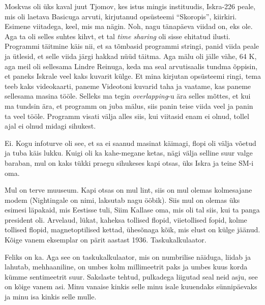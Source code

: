 Moskvas oli üks kaval juut Tjomov, kes istus mingis instituudis, Iskra-226 peale, mis oli laetava Basicuga arvuti, kirjutanud opsüsteemi \enquote{Skoropis}, kiirkiri. Esimene viitadega, keel, mis ma nägin. Noh, nagu tänapäeva viidad on, eks ole. Aga ta oli selles suhtes kihvt, et tal \emph{time sharing} oli sisse ehitatud ilusti. Programmi täitmine käis nii, et sa tõmbasid programmi stringi, panid viida peale ja ütlesid, et selle viida järgi hakkad nüüd täitma. Aga mälu oli jälle vähe, 64 K, aga meil oli sellesama Lindre Reinuga, keda ma seal arvutisaalis tundma õppisin, et paneks Iskrale veel kaks kuvarit külge. Et mina kirjutan opsüsteemi ringi, tema teeb kaks videokaarti, paneme Videotoni kuvarid taha ja vaatame, kas paneme sellesama masina tööle.  Selleks ma tegin \emph{overlapping}-u ära selles mõttes, et kui ma tundsin ära, et programm on juba mälus, siis panin teise viida veel ja panin ta veel tööle. Programm visati välja alles siis, kui viitasid enam ei olnud, tollel ajal ei olnud midagi sihukest. 


Ei. Kogu infoturve oli see, et sa ei saanud masinat käimagi, flopi oli välja võetud ja tuba käis lukku. Kuigi oli ka  kahe-megane ketas, nägi välja selline suur valge baraban, mul on kaks tükki praegu sihukeses kapi otsas, üks Iskra ja teine SM-i oma. 

Mul on terve muuseum. Kapi otsas on mul lint, siis on mul olemas kolmesajane modem (Nightingale on nimi, laksutab nagu ööbik). Siis mul on olemas üks esimesi läpakaid, mis Eestisse tuli, Siim Kallase oma, mis oli tal siis, kui ta panga president oli. Arvelaud, lükat, kaheksa tollised flopid, viietollised fopid, kolme tollised flopid, magnetoptilised kettad, ühesõnaga kõik, mis elust on külge jäänud. Kõige vanem eksemplar on pärit aastast 1936. Taskukalkulaator.


Feliks on ka. Aga see on taskukalkulaator, mis on numbrilise näiduga, liidab ja lahutab, mehhaaniline, on umbes kolm millimeetrit paks ja umbes kuus korda kümme sentimeetrit suur. Sakslaste tehtud, pulkadega liigutad seal neid asju, see on kõige vanem asi. Minu vanaise kinkis selle minu isale kuuendaks sünnipäevaks ja minu isa kinkis selle mulle. 

